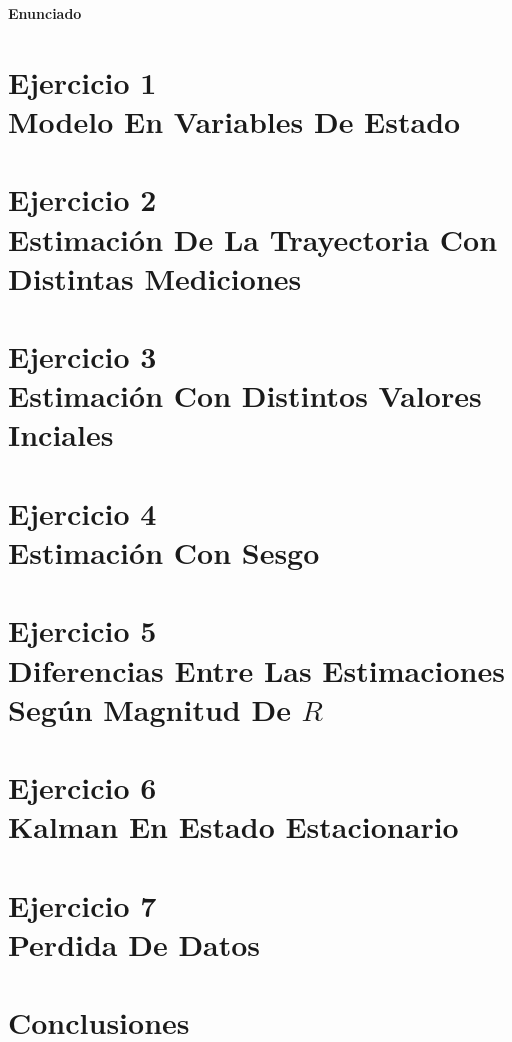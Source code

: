 \documentclass[10pt,a4paper]{article}
\begin{document}
		
	\setcounter{page}{1}

\begin{center}{\Large{\textbf{Enunciado}}}\end{center}
		

	\section{Ejercicio 1 \\ Modelo En Variables De Estado}\label{sec:ej1}
		
		
	\section{Ejercicio 2 \\ Estimación De La Trayectoria Con Distintas Mediciones}\label{sec:ej2}
		

	\section{Ejercicio 3 \\ Estimación Con Distintos Valores Inciales}\label{sec:ej3}
		

	\section{Ejercicio 4 \\ Estimación Con Sesgo}\label{sec:ej4}
		

	\section{Ejercicio 5 \\ Diferencias Entre Las Estimaciones Según Magnitud De $R$}\label{sec:ej5}
		

	\section{Ejercicio 6 \\ Kalman En Estado Estacionario}\label{sec:ej6}
		

	\section{Ejercicio 7 \\ Perdida De Datos}\label{sec:ej7}
		

	\section{Conclusiones}\label{sec:conclusiones}
		

\end{document}
